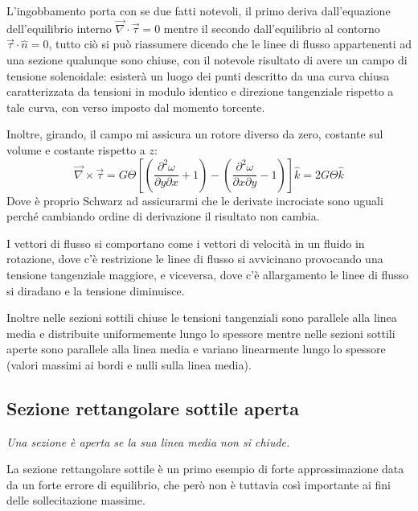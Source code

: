 			L'ingobbamento porta con se due fatti notevoli, il primo deriva dall'equazione dell'equilibrio interno $\vec{\nabla} \cdot \vec{\tau} = 0$ mentre il secondo dall'equilibrio al contorno $\vec{\tau} \cdot \hat{n}=0$, tutto ciò si può riassumere dicendo che le linee di flusso appartenenti ad una sezione qualunque sono chiuse, con il notevole risultato di avere un campo di tensione solenoidale: esisterà un luogo dei punti descritto da una curva chiusa caratterizzata da tensioni in modulo identico e direzione tangenziale rispetto a tale curva, con verso imposto dal momento torcente.\newline

			 Inoltre, girando, il campo mi assicura un rotore diverso da zero, costante sul volume e costante rispetto a $z$:
			 \[\vec{\nabla} \times \vec{\tau} = G\Theta \left[\left(\dfrac{\partial^2\omega}{\partial y \partial x} + 1\right) - \left(\dfrac{\partial^2\omega}{\partial x \partial y} - 1\right)\right]\hat{k} = 2G\Theta\hat{k}\]
			 Dove è proprio Schwarz ad assicurarmi che le derivate incrociate sono uguali perché cambiando ordine di derivazione il risultato non cambia. \newline 
			 
			 I vettori di flusso si comportano come i vettori di velocità in un fluido in rotazione, dove c'è restrizione le linee di flusso si avvicinano provocando una tensione tangenziale maggiore, e viceversa, dove c'è allargamento le linee di flusso si diradano e la tensione diminuisce. \newline 
			 
			 Inoltre nelle sezioni
			 sottili chiuse le tensioni tangenziali sono parallele alla linea media e distribuite
			 uniformemente lungo lo spessore mentre nelle sezioni sottili aperte sono parallele alla linea media e variano
			 linearmente lungo lo spessore (valori massimi ai bordi e nulli sulla linea media). 
			 
\subsection{ Sezione rettangolare sottile aperta}
			 \textit{Una sezione è aperta se la sua linea media non si chiude. }\newline
			 
			 La sezione rettangolare sottile è un primo esempio di forte approssimazione data da un forte errore di equilibrio, che però non è tuttavia così importante ai fini delle sollecitazione massime.  
			 
